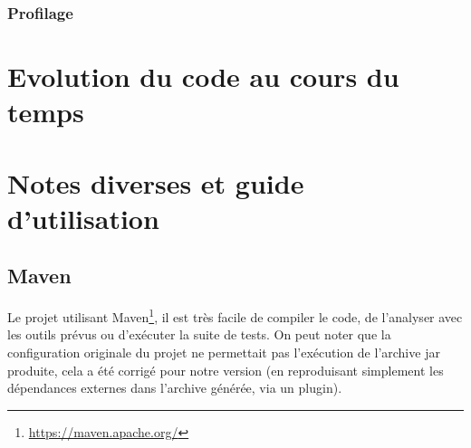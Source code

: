 \documentclass[12pt, openany]{report}
\begin{document}
\subsubsection{Profilage}

\section{Evolution du code au cours du temps}



\section{Notes diverses et guide d'utilisation}
\subsection{Maven}
Le projet utilisant Maven\footnote{\url{https://maven.apache.org/}}, il est très facile de compiler le code, de l'analyser avec les outils prévus ou d'exécuter la suite de tests.
On peut noter que la configuration originale du projet ne permettait pas l'exécution de l'archive jar produite, cela a été corrigé pour notre version (en reproduisant simplement les dépendances externes dans l'archive générée, via un plugin).
\end{document}
